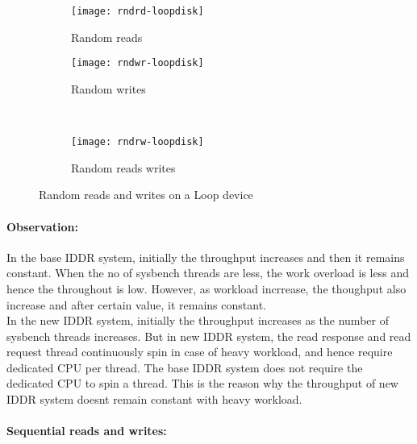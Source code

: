 \begin{figure}[!ht]
  \begin{subfigure}[b]{0.2\textwidth}
  \texttt{[image: rndrd-loopdisk]}
  \caption{Random reads}
  \label{subfig:rndrd-loopdisk}
  \end{subfigure}
  \hspace{50mm}
  \begin{subfigure}[b]{0.2\textwidth}
  \texttt{[image: rndwr-loopdisk]}
  \caption{Random writes}
  \label{subfig:rndwr-loopdisk}
  \end{subfigure}\\
  \begin{subfigure}[b]{0.3\textwidth}
  \texttt{[image: rndrw-loopdisk]}
  \caption{Random reads writes}
  \label{subfig:rndrw-loopdisk}
  \end{subfigure}
\caption{Random reads and writes on a Loop device}\label{fig:rndloopdisk}
\end{figure}

\paragraph{Observation:}
In the base IDDR system, initially the throughput increases and then it remains constant. When the no of sysbench threads are less, the work overload is less and hence the throughout is low. However, as workload incrrease, the thoughput also increase and after certain value, it remains constant. 
\\[3mm]
In the new IDDR system, initially the throughput increases as the number of sysbench threads increases. But in new IDDR system, the read response and read request thread continuously spin in case of heavy workload, and hence require dedicated CPU per thread. The base IDDR system does not require the dedicated CPU to spin a thread. This is the reason why the throughput of new IDDR system doesnt remain constant with heavy workload.  

\paragraph{Sequential reads and writes:}
